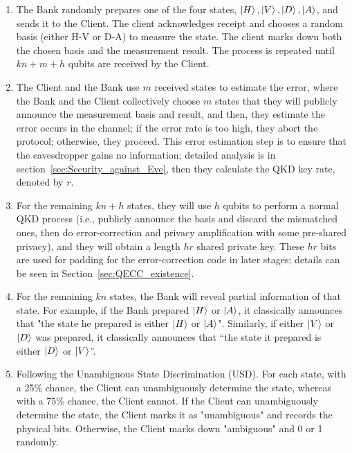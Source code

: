 \documentclass[%
 reprint,
superscriptaddress,
 amsmath,amssymb,
 aps,
]{revtex4-2}
\begin{document}
\begin{enumerate}

    \item The Bank randomly prepares one of the four states, $\ket{H}, \ket{V}, \ket{D}, \ket{A}$, and sends it to the Client. The client acknowledges receipt and chooses a random basis (either H-V or D-A) to measure the state. The client marks down both the chosen basis and the measurement result. The process is repeated until $kn+m+h$ qubits are received by the Client.

    \item The Client and the Bank use $m$ received states to estimate the error, where the Bank and the Client collectively choose $m$ states that they will publicly announce the measurement basis and result, and then, they estimate the error occurs in the channel; if the error rate is too high, they abort the protocol; otherwise, they proceed. This error estimation step is to ensure that the eavesdropper gains no information; detailed analysis is in section~\ref{sec:Security_against_Eve}, then they calculate the QKD key rate, denoted by $r$.

    \item For the remaining $kn+h$ states, they will use $h$ qubits to perform a normal QKD process (i.e., publicly announce the basis and discard the mismatched ones, then do error-correction and privacy amplification with some pre-shared privacy), and they will obtain a length $hr$ shared private key. These $hr$ bits are used for padding for the error-correction code in later stages; details can be seen in Section~\ref{sec:QECC_existence}. 

    \item For the remaining $kn$ states, the Bank will reveal partial information of that state. For example, if the Bank prepared $\ket{H}$ or $\ket{A}$, it classically announces that "the state he prepared is either $\ket{H}$ or $\ket{A}$". Similarly, if either $\ket{V}$ or $\ket{D}$ was prepared, it classically announces that ``the state it prepared is either $\ket{D}$ or $\ket{V}$''. 

    \item Following the Unambiguous State Discrimination (USD). For each state, with a 25\% chance, the Client can unambiguously determine the state, whereas with a 75\% chance, the Client cannot. If the Client can unambiguously determine the state, the Client marks it as "unambiguous" and records the physical bits. Otherwise, the Client marks down "ambiguous" and 0 or 1 randomly.



\end{enumerate}
\end{document}

